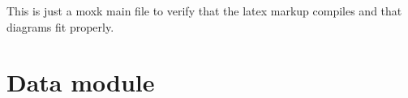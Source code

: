 \documentclass{article}
\begin{document}
This is just a moxk main file to verify that the latex markup compiles and that diagrams fit properly.
\section{Data module}\label{sec:data}
	
\end{document}
